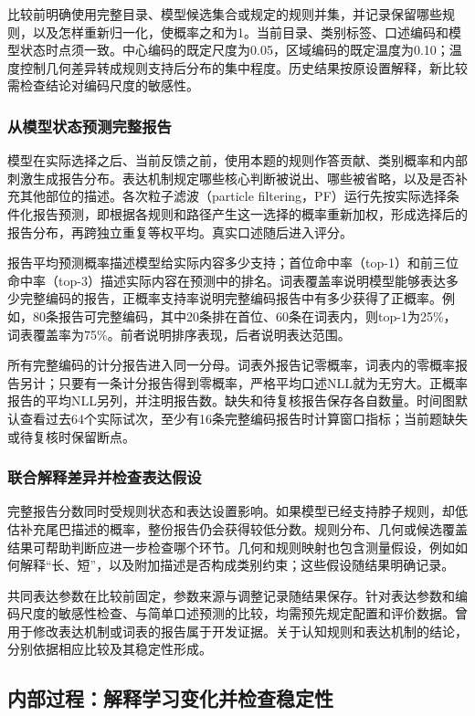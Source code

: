 \documentclass[12pt]{article}
\begin{document}
比较前明确使用完整目录、模型候选集合或规定的规则并集，并记录保留哪些规则，以及怎样重新归一化，使概率之和为1。当前目录、类别标签、口述编码和模型状态时点须一致。中心编码的既定尺度为0.05，区域编码的既定温度为0.10；温度控制几何差异转成规则支持后分布的集中程度。历史结果按原设置解释，新比较需检查结论对编码尺度的敏感性。

\subsubsection{从模型状态预测完整报告}

模型在实际选择之后、当前反馈之前，使用本题的规则作答贡献、类别概率和内部刺激生成报告分布。表达机制规定哪些核心判断被说出、哪些被省略，以及是否补充其他部位的描述。各次粒子滤波（particle filtering，PF）运行先按实际选择条件化报告预测，即根据各规则和路径产生这一选择的概率重新加权，形成选择后的报告分布，再跨独立重复等权平均。真实口述随后进入评分。

报告平均预测概率描述模型给实际内容多少支持；首位命中率（top-1）和前三位命中率（top-3）描述实际内容在预测中的排名。词表覆盖率说明模型能够表达多少完整编码的报告，正概率支持率说明完整编码报告中有多少获得了正概率。例如，80条报告可完整编码，其中20条排在首位、60条在词表内，则top-1为25\%，词表覆盖率为75\%。前者说明排序表现，后者说明表达范围。

所有完整编码的计分报告进入同一分母。词表外报告记零概率，词表内的零概率报告另计；只要有一条计分报告得到零概率，严格平均口述NLL就为无穷大。正概率报告的平均NLL另列，并注明报告数。缺失和待复核报告保存各自数量。时间图默认查看过去64个实际试次，至少有16条完整编码报告时计算窗口指标；当前题缺失或待复核时保留断点。

\subsubsection{联合解释差异并检查表达假设}

完整报告分数同时受规则状态和表达设置影响。如果模型已经支持脖子规则，却低估补充尾巴描述的概率，整份报告仍会获得较低分数。规则分布、几何或候选覆盖结果可帮助判断应进一步检查哪个环节。几何和规则映射也包含测量假设，例如如何解释“长、短”，以及附加描述是否构成类别约束；这些假设随结果明确记录。

共同表达参数在比较前固定，参数来源与调整记录随结果保存。针对表达参数和编码尺度的敏感性检查、与简单口述预测的比较，均需预先规定配置和评价数据。曾用于修改表达机制或词表的报告属于开发证据。关于认知规则和表达机制的结论，分别依据相应比较及其稳定性形成。

\subsection{内部过程：解释学习变化并检查稳定性}
\label{sec:evaluation-4}
\end{document}
